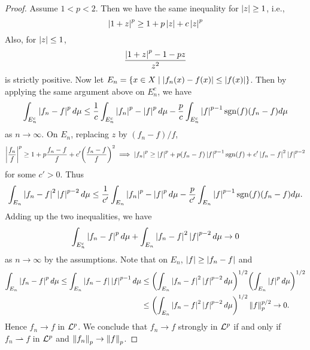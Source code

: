 \begin{proof}
    Assume $1<p<2$. Then we have the same inequality for $\left\lvert {z} \right\rvert\geq 1$, i.e., 
    \begin{equation*}
        \left\lvert {1+z} \right\rvert^p \geq 1 + p\left\lvert {z} \right\rvert + c\left\lvert {z} \right\rvert^p
    \end{equation*}
    Also, for $\left\lvert {z} \right\rvert\leq 1$, 
    \begin{equation*}
        \frac{\left\lvert {1+z} \right\rvert^p-1-pz}{z^2}
    \end{equation*}
    is strictly positive. Now let $E_n = \left\{ x\in X \;\middle\vert\; \left\lvert {f_n(x)-f(x)} \right\rvert\leq \left\lvert {f(x)} \right\rvert \right\}$. Then 
    by applying the same argument above on $E_n^c$, we have 
    \begin{equation*}
        \int_{E_n^c} \left\lvert {f_n-f} \right\rvert^pd\mu \leq \frac{1}{c}\int_{E_n^c}\left\lvert {f_n} \right\rvert^p-\left\lvert {f} \right\rvert^pd\mu - \frac{p}{c}\int_{E_n^c}\left\lvert {f} \right\rvert^{p-1}\operatorname{sgn}(f)(f_n-f)d\mu
    \end{equation*} 
    as $n\to\infty$. On $E_n$, replacing $z$ by $(f_n-f)/f$,
    \begin{equation*}
        \abs{\frac{f_n}{f}}^p \geq 1 + p\frac{f_n-f}{f} + c'\pth{\frac{f_n-f}{f}}^2 
        \implies \abs{f_n}^p \geq \abs{f}^p + p(f_n-f)\abs{f}^{p-1}\sgn(f) + c'\abs{f_n-f}^2\abs{f}^{p-2}
    \end{equation*}
    for some $c'>0$. Thus
    \begin{equation*}
        \int_{E_n} \left\lvert {f_n-f} \right\rvert^2\left\lvert {f} \right\rvert^{p-2}d\mu \leq \frac{1}{c'}\int_{E_n}\left\lvert {f_n} \right\rvert^p-\left\lvert {f} \right\rvert^pd\mu - \frac{p}{c'}\int_{E_n}\left\lvert {f} \right\rvert^{p-1}\operatorname{sgn}(f)(f_n-f)d\mu.
    \end{equation*}
    Adding up the two inequalities, we have 
    \begin{equation*}
        \int_{E_n^c} \left\lvert {f_n-f} \right\rvert^pd\mu + \int_{E_n} \left\lvert {f_n-f} \right\rvert^2\left\lvert {f} \right\rvert^{p-2}d\mu \to 0
    \end{equation*}
    as $n\to\infty$ by the assumptions. Note that on $E_n$, $\left\lvert {f} \right\rvert\geq \left\lvert {f_n-f} \right\rvert$ and 
    \begin{equation*}
        \begin{split}
            \int_{E_n} \abs{f_n-f}^pd\mu \leq \int_{E_n} \abs{f_n-f}\abs{f}^{p-1}d\mu 
            &\leq \pth{\int_{E_n} \abs{f_n-f}^2\abs{f}^{p-2}d\mu}^{1/2}\pth{\int_{E_n}\abs{f}^pd\mu}^{1/2} \\
            &\leq \pth{\int_{E_n} \abs{f_n-f}^2\abs{f}^{p-2}d\mu}^{1/2}\norm{f}_p^{p/2}\to 0.
        \end{split}
    \end{equation*}
    Hence $f_n\to f$ in $\mathcal{L}^p$. We conclude that $f_n\to f$ strongly in $\mathcal{L}^p$ if and only if
    $f_n\rightharpoonup f$ in $\mathcal{L}^p$ and $\left\lVert {f_n} \right\rVert_p\to\left\lVert {f} \right\rVert_p$.
\end{proof}
